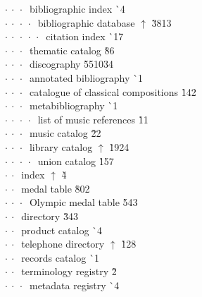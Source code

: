 \begin{tabbing}
$\cdot\:\cdot\:\cdot\:$  bibliographic index  \` {\raisebox{.4\height}{\scalebox{.6}{+}}}4\\
$\cdot\:\cdot\:\cdot\:\cdot\:$  bibliographic database $\uparrow$ \` 38{\raisebox{.4\height}{\scalebox{.6}{+}}}13\\
$\cdot\:\cdot\:\cdot\:\cdot\:\cdot\:$  citation index  \` {\raisebox{.4\height}{\scalebox{.6}{+}}}17\\
$\cdot\:\cdot\:\cdot\:$  thematic catalog  \` 8{\raisebox{.4\height}{\scalebox{.6}{+}}}6\\
$\cdot\:\cdot\:\cdot\:$  discography  \` 5510{\raisebox{.4\height}{\scalebox{.6}{+}}}34\\
$\cdot\:\cdot\:\cdot\:$  annotated bibliography  \` {\raisebox{.4\height}{\scalebox{.6}{+}}}1\\
$\cdot\:\cdot\:\cdot\:$  catalogue of classical compositions  \` 14{\raisebox{.4\height}{\scalebox{.6}{+}}}2\\
$\cdot\:\cdot\:\cdot\:$  metabibliography  \` {\raisebox{.4\height}{\scalebox{.6}{+}}}1\\
$\cdot\:\cdot\:\cdot\:\cdot\:$  list of music references  \` 1{\raisebox{.4\height}{\scalebox{.6}{+}}}1\\
$\cdot\:\cdot\:\cdot\:$  music catalog  \` 2{\raisebox{.4\height}{\scalebox{.6}{+}}}2\\
$\cdot\:\cdot\:\cdot\:$  library catalog $\uparrow$ \` 19{\raisebox{.4\height}{\scalebox{.6}{+}}}24\\
$\cdot\:\cdot\:\cdot\:\cdot\:$  union catalog  \` 15{\raisebox{.4\height}{\scalebox{.6}{+}}}7\\
$\cdot\:\cdot\:$  index $\uparrow$ \` 4\\
$\cdot\:\cdot\:$  medal table  \` 80{\raisebox{.4\height}{\scalebox{.6}{+}}}2\\
$\cdot\:\cdot\:\cdot\:$  Olympic medal table  \` 54{\raisebox{.4\height}{\scalebox{.6}{+}}}3\\
$\cdot\:\cdot\:$  directory  \` 3{\raisebox{.4\height}{\scalebox{.6}{+}}}43\\
$\cdot\:\cdot\:$  product catalog  \` {\raisebox{.4\height}{\scalebox{.6}{+}}}4\\
$\cdot\:\cdot\:$  telephone directory $\uparrow$ \` 1{\raisebox{.4\height}{\scalebox{.6}{+}}}28\\
$\cdot\:\cdot\:$  records catalog  \` {\raisebox{.4\height}{\scalebox{.6}{+}}}1\\
$\cdot\:\cdot\:$  terminology registry  \` 2\\
$\cdot\:\cdot\:\cdot\:$  metadata registry  \` {\raisebox{.4\height}{\scalebox{.6}{+}}}4\\

\end{tabbing}
